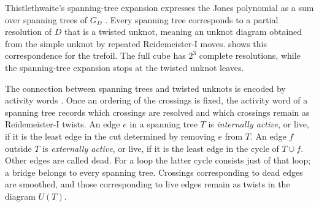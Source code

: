 \documentclass[a4paper,onecolumn,unpublished]{quantumarticle}
\theoremstyle{plain}
\theoremstyle{definition}
\theoremstyle{definition}
\numberwithin{equation}{section}
\begin{document}
Thistlethwaite's spanning-tree expansion expresses the Jones polynomial as a sum over spanning trees of \(G_D\) \cite{This}. Every spanning tree corresponds to a partial resolution of \(D\) that is a twisted unknot, meaning an unknot diagram obtained from the simple unknot by repeated Reidemeister-I moves.  shows this correspondence for the trefoil. The full cube has \(2^3\) complete resolutions, while the spanning-tree expansion stops at the twisted unknot leaves.

The connection between spanning trees and twisted unknots is encoded by activity words \cite{This}. Once an ordering of the crossings is fixed, the activity word of a spanning tree records which crossings are resolved and which crossings remain as Reidemeister-I twists. An edge \(e\) in a spanning tree \(T\) is \emph{internally active}, or live, if it is the least edge in the cut determined by removing \(e\) from \(T\). An edge \(f\) outside \(T\) is \emph{externally active}, or live, if it is the least edge in the cycle of \(T\cup f\). Other edges are called dead. For a loop the latter cycle consists just of that loop; a bridge belongs to every spanning tree. Crossings corresponding to dead edges are smoothed, and those corresponding to live edges remain as twists in the diagram \(U(T)\).
\end{document}
